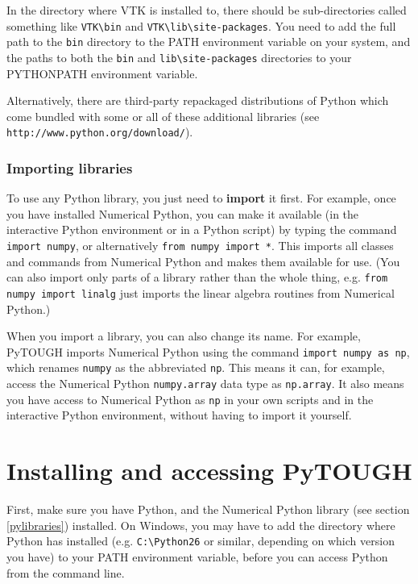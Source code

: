 In the directory where VTK is installed to, there should be sub-directories called something like \texttt{VTK\textbackslash bin} and \texttt{VTK\textbackslash lib\textbackslash site-packages}.  You need to add the full path to the \texttt{bin} directory to the PATH environment variable on your system, and the paths to both the \texttt{bin} and \texttt{lib\textbackslash site-packages} directories to your PYTHONPATH environment variable.

Alternatively, there are third-party repackaged distributions of Python which come bundled with some or all of these additional libraries (see \texttt{http://www.python.org/download/}).

\subsubsection{Importing libraries}

To use any Python library, you just need to \textbf{import} it first.  For example, once you have installed Numerical Python, you can make it available (in the interactive Python environment or in a Python script) by typing the command \texttt{import numpy}, or alternatively \texttt{from numpy import *}.  This imports all classes and commands from Numerical Python and makes them available for use.  (You can also import only parts of a library rather than the whole thing, e.g. \texttt{from numpy import linalg} just imports the linear algebra routines from Numerical Python.)

When you import a library, you can also change its name.  For example, PyTOUGH imports Numerical Python using the command \texttt{import numpy as np}, which renames \texttt{numpy} as the abbreviated \texttt{np}.  This means it can, for example, access the Numerical Python \texttt{numpy.array} data type as \texttt{np.array}.  It also means you have access to Numerical Python as \texttt{np} in your own scripts and in the interactive Python environment, without having to import it yourself.

\section{Installing and accessing PyTOUGH}
\label{installing}

First, make sure you have Python, and the Numerical Python library (see section \ref{pylibraries}) installed.  On Windows, you may have to add the directory where Python has installed (e.g. \texttt{C:\textbackslash Python26} or similar, depending on which version you have) to your PATH environment variable, before you can access Python from the command line.

